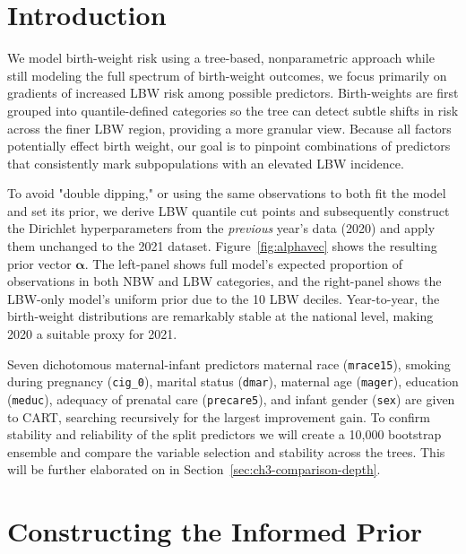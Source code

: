 \section{Introduction}
\label{sec:ch3-introduction}
We model birth-weight risk using a tree-based, nonparametric approach while still modeling the full spectrum of birth-weight outcomes, we focus primarily on gradients of increased LBW risk among possible predictors. Birth-weights are first grouped into quantile-defined categories so the tree can detect subtle shifts in risk across the finer LBW region, providing a more granular view. Because all factors potentially effect birth weight, our goal is to pinpoint combinations of predictors that consistently mark subpopulations with an elevated LBW incidence. 

To avoid "double dipping," or using the same observations to both fit the model and set its prior, we derive LBW quantile cut points and subsequently construct the Dirichlet hyperparameters from the \emph{previous} year's data (2020) and apply them unchanged to the 2021 dataset. Figure~\ref{fig:alphavec} shows the resulting prior vector \(\boldsymbol\alpha\). The left-panel shows full model's expected proportion of observations in both NBW and LBW categories, and the right-panel shows the LBW-only model's uniform prior due to the 10 LBW deciles. Year-to-year, the birth-weight distributions are remarkably stable at the national level, making 2020 a suitable proxy for 2021.

Seven dichotomous maternal-infant predictors maternal race (\texttt{mrace15}), smoking during pregnancy (\texttt{cig\_0}), marital status (\texttt{dmar}), maternal age (\texttt{mager}), education (\texttt{meduc}), adequacy of prenatal care (\texttt{precare5}), and infant gender (\texttt{sex}) are given to CART, searching recursively for the largest improvement gain. To confirm stability and reliability of the split predictors we will create a 10,000 bootstrap ensemble and compare the variable selection and stability across the trees. This will be further elaborated on in Section~\ref{sec:ch3-comparison-depth}. 

\section{Constructing the Informed Prior}
\label{sec:ch3-prior}

